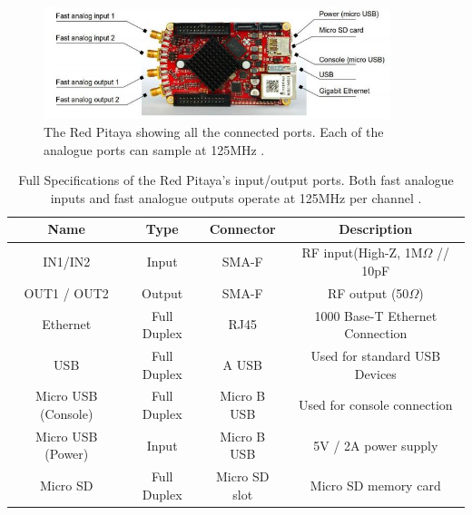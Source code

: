 \documentclass[12pt,a4paper,oneside]{report}
\begin{document}
\begin{figure}[H]
\includegraphics[width=0.9\textwidth, center,angle=0]{Images/RP.JPG}
\caption{The Red Pitaya showing all the connected ports. Each of the analogue ports can sample at 125MHz \cite[p.~7]{Leban2014RedManual}.}
\label{RP}
\end{figure}

\begin{table}[H]
	\setlength\arrayrulewidth{1pt}
    \begin{tabular}{ c c c c } 
        Name & Type & Connector & Description\\
        \hline
        IN1/IN2 & Input & SMA-F & RF input(High-Z, 1M$\Omega$ // 10pF\\[1pt]
        OUT1 / OUT2 & Output & SMA-F & RF output (50$\Omega$)\\[1pt]
        Ethernet & Full Duplex & RJ45 & 1000 Base-T Ethernet Connection\\[1pt]
        USB & Full Duplex & A USB & Used for standard USB Devices\\[1pt]
        Micro USB (Console) & Full Duplex & Micro B USB & Used for console connection\\[1pt]
        Micro USB (Power) & Input & Micro B USB & 5V / 2A power supply\\[1pt]
        Micro SD & Full Duplex & Micro SD slot & Micro SD memory card\\
    \end{tabular}
    \caption{Full Specifications of the Red Pitaya's input/output ports. Both fast analogue inputs and fast analogue outputs operate at 125MHz per channel \cite[p.~7]{Leban2014RedManual}.}
    \label{RPspec}
\end{table}
\end{document}
